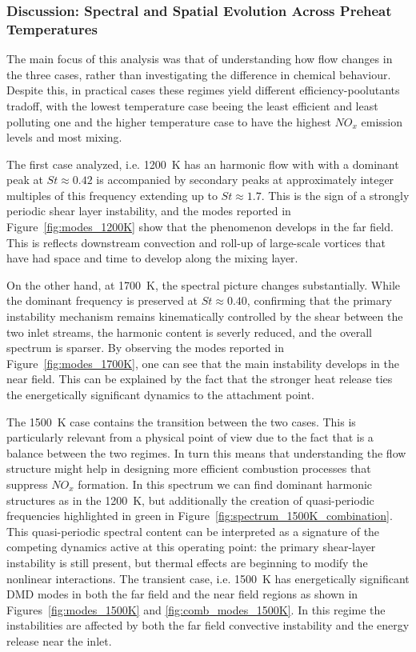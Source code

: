 \subsubsection*{Discussion: Spectral and Spatial Evolution Across Preheat Temperatures}

The main focus of this analysis was that of understanding how flow changes in the three cases, rather than investigating the difference in chemical behaviour. Despite this, in practical cases these regimes yield different efficiency-poolutants tradoff, with the lowest temperature case beeing the least efficient and least polluting one and the higher temperature case to have the highest $NO_x$ emission levels and most mixing. 

The first case analyzed, i.e. 1200~K has an harmonic flow with with a dominant peak at $St \approx 0.42$ is accompanied by secondary peaks at approximately integer multiples of this frequency extending up to $St \approx 1.7$. This is the sign of a strongly periodic shear layer instability, and the modes reported in Figure~\ref{fig:modes_1200K} show that the phenomenon develops in the far field. This is reflects downstream convection and roll-up of large-scale vortices that have had space and time to develop along the mixing layer.

On the other hand, at 1700~K, the spectral picture changes substantially. While the dominant frequency is preserved at $St \approx 0.40$, confirming that the primary instability mechanism remains kinematically controlled by the shear between the two inlet streams, the harmonic content is severly reduced, and the overall spectrum is sparser. By observing the modes reported in Figure~\ref{fig:modes_1700K}, one can see that the main instability develops in the near field. This can be explained by the fact that the stronger heat release ties the energetically significant dynamics to the  attachment point.

The 1500~K case contains the transition between the two cases. This is particularly relevant from a physical point of view due to the fact that is a balance between the two regimes. In turn this means that understanding the flow structure might help in designing more efficient combustion processes that suppress $NO_x$ formation.
In this spectrum we can find dominant harmonic structures as in the 1200~K, but additionally the creation of quasi-periodic frequencies highlighted in green in Figure~\ref{fig:spectrum_1500K_combination}. This quasi-periodic spectral content can be interpreted as a signature of the competing dynamics active at this operating point: the primary shear-layer instability is still present, but thermal effects are beginning to modify the nonlinear interactions.
The transient case, i.e. 1500~K has energetically significant DMD modes in both the far field and the near field regions as shown in Figures~\ref{fig:modes_1500K} and \ref{fig:comb_modes_1500K}. In this regime the instabilities are affected by both the far field convective instability and the energy release near the inlet.

